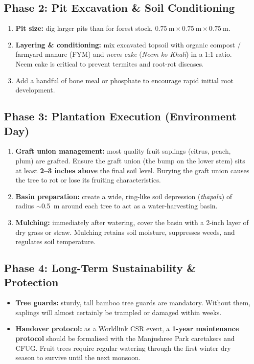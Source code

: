 \documentclass[11pt,a4paper]{article}
\begin{document}
\subsection{Phase 2: Pit Excavation \& Soil Conditioning}
\begin{enumerate}
  \item \textbf{Pit size:} dig larger pits than for forest stock, $0.75~\text{m} \times 0.75~\text{m} \times 0.75~\text{m}$.
  \item \textbf{Layering \& conditioning:} mix excavated topsoil with organic compost / farmyard manure (FYM) and \emph{neem cake} (\emph{Neem ko Khali}) in a 1:1 ratio. Neem cake is critical to prevent termites and root-rot diseases.
  \item Add a handful of bone meal or phosphate to encourage rapid initial root development.
\end{enumerate}

\subsection{Phase 3: Plantation Execution (Environment Day)}
\begin{enumerate}
  \item \textbf{Graft union management:} most quality fruit saplings (citrus, peach, plum) are grafted. Ensure the graft union (the bump on the lower stem) sits at least \textbf{2--3 inches above} the final soil level. Burying the graft union causes the tree to rot or lose its fruiting characteristics.
  \item \textbf{Basin preparation:} create a wide, ring-like soil depression (\emph{th\=apal\=a}) of radius $\sim$0.5~m around each tree to act as a water-harvesting basin.
  \item \textbf{Mulching:} immediately after watering, cover the basin with a 2-inch layer of dry grass or straw. Mulching retains soil moisture, suppresses weeds, and regulates soil temperature.
\end{enumerate}

\subsection{Phase 4: Long-Term Sustainability \& Protection}
\begin{itemize}
  \item \textbf{Tree guards:} sturdy, tall bamboo tree guards are mandatory. Without them, saplings will almost certainly be trampled or damaged within weeks.
  \item \textbf{Handover protocol:} as a Worldlink CSR event, a \textbf{1-year maintenance protocol} should be formalised with the Manjushree Park caretakers and CFUG. Fruit trees require regular watering through the first winter dry season to survive until the next monsoon.
\end{itemize}
\end{document}
